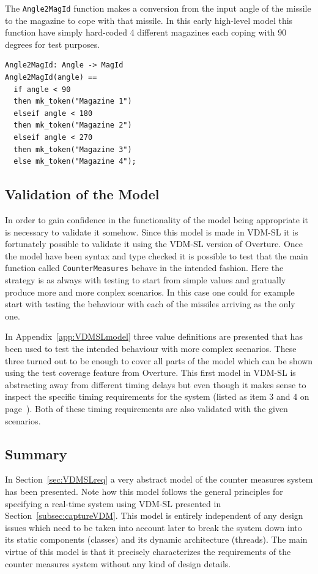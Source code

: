 \documentclass{overturerepchap}
\begin{document}
The \texttt{Angle2MagId} function makes a conversion from the input angle
of the missile to the magazine to cope with that missile. In this early 
high-level model this function have simply hard-coded 4 different magazines
each coping with 90 degrees for test purposes.

\begin{lstlisting}
Angle2MagId: Angle -> MagId
Angle2MagId(angle) ==
  if angle < 90
  then mk_token("Magazine 1")
  elseif angle < 180
  then mk_token("Magazine 2")
  elseif angle < 270
  then mk_token("Magazine 3")
  else mk_token("Magazine 4");
\end{lstlisting}

\subsection{Validation of the Model}

In order to gain confidence in the functionality of the model being 
appropriate it is necessary to validate it somehow. Since this model 
is made in VDM-SL it is fortunately possible to validate it using
the VDM-SL version of Overture. Once the model have been syntax and 
type checked it is possible to test that the main function called
\texttt{CounterMeasures} behave in the intended fashion. Here the strategy
is as always with testing to start from simple values and gratually 
produce more and more conplex scenarios. In this case one could for
example start with testing the behaviour with each of the missiles 
arriving as the only one. 

In Appendix~\ref{app:VDMSLmodel} three 
value definitions are presented that has been used to test the intended
behaviour with more complex scenarios. These three turned out to be 
enough to cover all parts of the model which can be shown using the
test coverage feature from Overture. This first model in VDM-SL is
abstracting away from different timing delays but even though it makes
sense to inspect the specific timing requirements for the system 
(listed as item 3 and 4 on page~\pageref{timereq34}). Both of these
timing requirements are also validated with the given scenarios.

\subsection{Summary}

In Section~\ref{sec:VDMSLreq} a very abstract model of the counter
measures system has been presented.  Note how this model follows the
general principles for specifying a real-time system using VDM-SL
presented in Section~\ref{subsec:captureVDM}. This model is entirely
independent of any design issues which need to be taken into account
later to break the system down into its static components (classes)
and its dynamic architecture (threads). The main virtue of this model
is that it precisely characterizes the requirements of the counter
measures system without any kind of design details.
\end{document}
